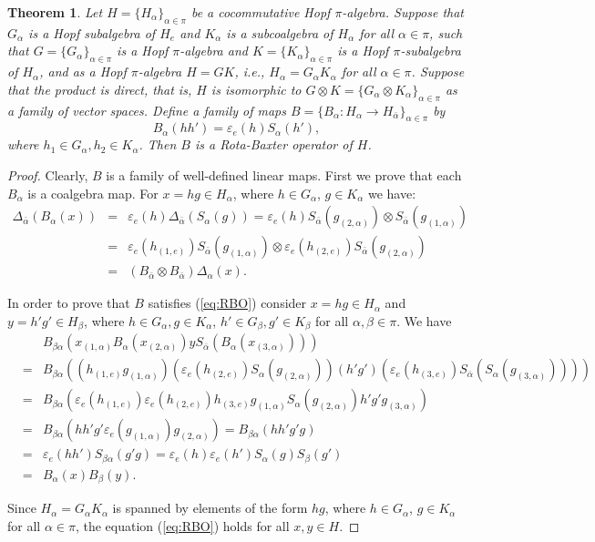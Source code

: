 \documentclass[11pt]{article}
\def\a{\alpha}
\def\b{\beta}
\def\v{\varepsilon}
\newtheorem{theorem}{Theorem}[section]
\begin{document}
\begin{theorem}
Let $H=\{H_\a\}_{\a\in\pi}$ be a cocommutative Hopf $\pi$-algebra. Suppose that $G_\a$ is a Hopf subalgebra of $H_e$ and $K_\a$ is a subcoalgebra of $H_\a$ for all $\a\in\pi$, such that $G=\{G_\a\}_{\a\in\pi}$ is a Hopf $\pi$-algebra and $K=\{K_\a\}_{\a\in\pi}$ is a Hopf $\pi$-subalgebra of $H_\a$, and as a Hopf $\pi$-algebra $H=GK$, i.e., $H_\a=G_\a K_\a$ for all $\a\in\pi$. 
Suppose that the product is direct, that is, $H$ is isomorphic to $G\otimes K=\{G_\a \otimes K_\a\}_{\a\in\pi}$ as a family of vector spaces. Define a family of maps $B=\{B_\a:H_\a\rightarrow H_{\bar{\a}}\}_{\a\in\pi}$ by
$$B_\a (h h')=\v_e(h)S_\a(h'),$$
where $h_1\in G_\a, h_2\in K_\a$. 
Then $B$ is a Rota-Baxter operator of $H$.
\end{theorem}
\begin{proof}
Clearly, $B$ is a family of well-defined linear maps. 
First we prove that each $B_\a$ is a coalgebra map. For $x=hg\in H_\a$, where $h\in G_\a$, $g\in K_\a$ we have:
\begin{eqnarray*}
\Delta_{\bar{\a}}(B_\a(x))&=&\v_e(h)\Delta_{\bar{\a}}(S_\a(g))=\v_e(h) S_{\bar{\a}}(g_{(2,\a)})\otimes S_{\bar{\a}}(g_{(1,\a)})\\
&=&\v_e(h_{(1,e)})S_{\bar{\a}}(g_{(1,\a)})\otimes \v_e(h_{(2,e)})S_{\bar{\a}}(g_{(2,\a)})\\
&=&(B_{\bar{\a}}\otimes B_{\bar{\a}})\Delta_\a(x).
\end{eqnarray*}

In order to prove that $B$ satisfies (\ref{eq:RBO}) consider $x=hg\in H_\a$  and $y=h'g'\in H_\b$, where $h\in G_\a, g\in K_\a$, $h'\in G_\b, g'\in K_\b$ for all $\a,\b\in\pi$. We have
\begin{eqnarray*}
 &&B_{\b\a}(x_{(1,\a)}B_\a(x_{(2,\a)})yS_{\bar{\a}}(B_\a(x_{(3,\a)})))\\
 &=&B_{\b\a}((h_{(1,e)}g_{(1,\a)})(\v_e(h_{(2,e)})S_\a (g_{(2,\a)}))(h'g')(\v_e(h_{(3,e)})S_{\bar{\a}}(S_\a(g_{(3,\a)}))))\\
 &=&B_{\b\a}(\v_e(h_{(1,e)})\v_e(h_{(2,e)})h_{(3,e)}g_{(1,\a)}S_\a(g_{(2,\a)}) h'g' g_{(3,\a)})\\
 &=&B_{\b\a}(hh' g' \v_e(g_{(1,\a)})g_{(2,\a)}) = B_{\b\a}(hh'g'g)\\
 &=&\v_{e}(hh')S_{\b\a}(g'g)=\v_e(h)\v_e(h')S_\a(g)S_\b(g')\\
 &=&B_\a(x)B_\b(y).
\end{eqnarray*}

Since $H_\a=G_\a K_\a$ is spanned by elements of the form $hg$, where $h\in G_\a$, $g\in K_\a$ for all $\a\in\pi$, the equation (\ref{eq:RBO}) holds for all $x,y\in H$.
\end{proof}
\end{document}
